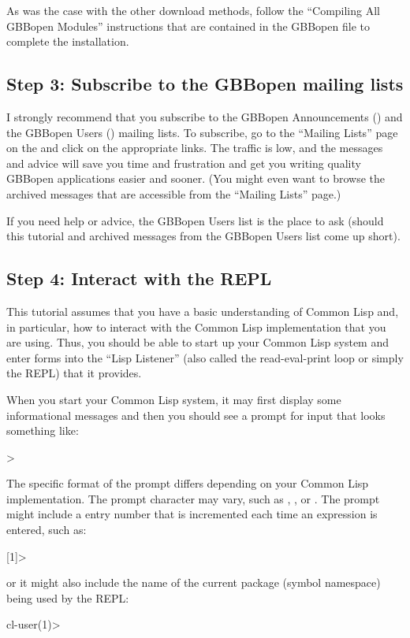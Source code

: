 \documentclass[10pt,twoside,english,pdftex]{article}
\begin{document}
As was the case with the other download methods, follow the ``Compiling
All GBBopen Modules'' instructions that are contained in the GBBopen
 file to complete the installation.


\subsection*{Step 3: Subscribe to the GBBopen mailing lists}

%
I strongly recommend that you subscribe to the GBBopen Announcements
() and the GBBopen Users
() mailing lists.  To subscribe, go to the ``Mailing
Lists'' page on the  and
click on the appropriate  links.  The traffic is low, and the
messages and advice will save you time and frustration and get you writing
quality GBBopen applications easier and sooner.  (You might even want to
browse the archived messages that are accessible from the ``Mailing Lists''
page.)

If you need help or advice, the GBBopen Users list is the place to ask (should
this tutorial and archived messages from the GBBopen Users list come up
short).

\subsection*{Step 4: Interact with the REPL}

%
%
This tutorial assumes that you have a basic understanding of Common Lisp and,
in particular, how to interact with the Common Lisp implementation that you
are using.  Thus, you should be able to start up your Common Lisp system and
enter forms into the ``Lisp Listener'' (also called the read-eval-print loop
or simply the REPL) that it provides.  

When you start your Common Lisp system, it may first display some informational
messages and then you should see a prompt for input that looks something like:
%
\W\supp
\begin{example}
\textcolor{darkergray}{%
  >}
\end{example}
%
The specific format of the prompt differs depending on your Common Lisp
implementation.  The prompt character may vary, such as \code{*}, \code{:}, or
.  The prompt might include a entry number that is incremented each
time an expression is entered, such as:
%
\W\supp\notpretop
\begin{example}
\textcolor{darkergray}{%
  [1]>}
\end{example}
%
or it might also include the name of the current package (symbol namespace)
being used by the REPL:
%
\W\supp\notpretop
\begin{example}
\textcolor{darkergray}{%
  cl-user(1)>}
\end{example}
\end{document}
